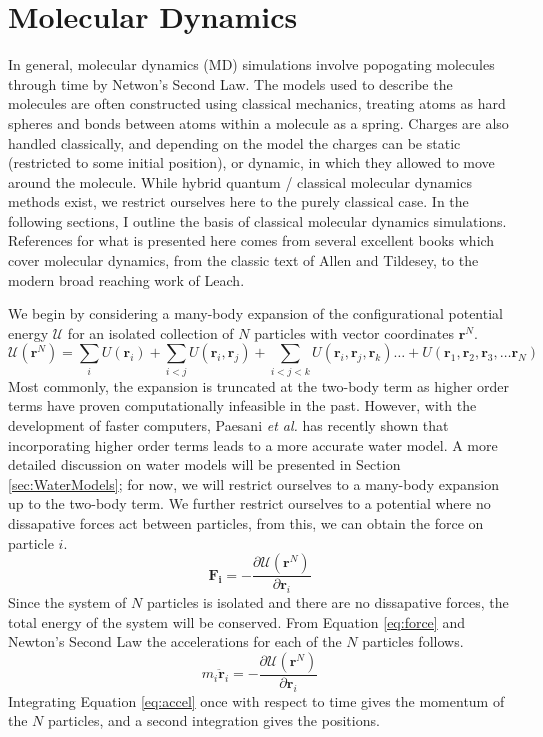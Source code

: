 \section{Molecular Dynamics}
In general, molecular dynamics (MD) simulations involve
popogating molecules through time by Netwon's Second Law. The models
used to describe the molecules are often constructed using classical
mechanics, treating atoms as hard spheres and bonds between atoms
within a molecule as a spring. Charges are also handled classically,
and depending on the model the charges can be static (restricted to
some initial position), or dynamic, in which they allowed to move
around the molecule. While hybrid quantum / classical molecular
dynamics methods exist, we restrict ourselves here to the purely
classical case. In the following sections, I outline the basis of
classical molecular dynamics simulations. References for what is
presented here comes from several excellent books which cover molecular
dynamics, from the classic text of Allen and Tildesey, to the modern
broad reaching work of Leach.\cite{Allen1987,Leach2001}

We begin by considering a many-body expansion of the configurational
potential energy $\mathscr{U}$ for an isolated collection of $N$ particles with
vector coordinates $\mathbf{r}^N$.
\begin{equation}\label{eq:potE}
\mathscr{U}(\mathbf{r}^N) = \sum_i U(\mathbf{r}_i) + \sum_{i<j}
U(\mathbf{r}_i,\mathbf{r}_j) + \sum_{i<j<k} U(\mathbf{r}_i,\mathbf{r}_j,\mathbf{r}_k) \dots + U(\mathbf{r}_1,\mathbf{r}_2,\mathbf{r}_3,\dots \mathbf{r}_N)
\end{equation}
Most commonly, the expansion is truncated at the two-body term as
higher order terms have proven computationally infeasible in the
past. However, with the development of faster computers, Paesani
\textit{et al.} has recently shown that incorporating higher order
terms leads to a more accurate water model.\cite{Paesani2016} A more
detailed discussion on water models will be presented in Section
\ref{sec:WaterModels}; for now, we will restrict ourselves to a
many-body expansion up to the two-body term. We further restrict
ourselves to a potential where no dissapative forces act between
particles, from this, we can obtain the force on particle $i$.
\begin{equation}\label{eq:force}
\mathbf{F_i} = -\frac{\partial \mathscr{U}(\mathbf{r}^N)}{\partial \mathbf{r}_i}
\end{equation} 
Since the system of $N$ particles is isolated and there are no
dissapative forces, the total energy of the system will be
conserved. From Equation \eqref{eq:force} and Newton's Second Law the
accelerations for each of the $N$ particles follows.
\begin{equation}\label{eq:accel}
 m_i\mathbf{\ddot{r}}_i = -\frac{\partial \mathscr{U}(\mathbf{r}^N)}{\partial \mathbf{r}_i}
\end{equation}
Integrating Equation \eqref{eq:accel} once with respect to time gives
the momentum of the $N$ particles, and a second integration gives the
positions.

